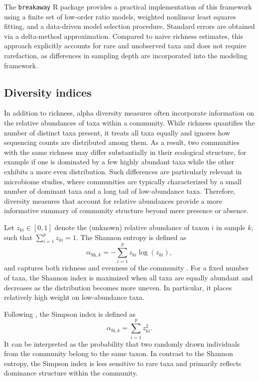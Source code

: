 The \texttt{breakaway} R package provides a practical implementation of this framework using a finite set of low-order ratio models, weighted nonlinear least squares fitting, and a data-driven model selection procedure. Standard errors are obtained via a delta-method approximation. Compared to naive richness estimates, this approach explicitly accounts for rare and unobserved taxa and does not require rarefaction, as differences in sampling depth are incorporated into the modeling framework.

\subsection{Diversity indices}
\label{sec:3community:within:diversity}

In addition to richness, alpha diversity measures often incorporate information on the relative abundances of taxa within a community. While richness quantifies the number of distinct taxa present, it treats all taxa equally and ignores how sequencing counts are distributed among them. As a result, two communities with the same richness may differ substantially in their ecological structure, for example if one is dominated by a few highly abundant taxa while the other exhibits a more even distribution. Such differences are particularly relevant in microbiome studies, where communities are typically characterized by a small number of dominant taxa and a long tail of low-abundance taxa. Therefore, diversity measures that account for relative abundances provide a more informative summary of community structure beyond mere presence or absence.

Let $z_{ki} \in [0,1]$ denote the (unknown) relative abundance of taxon $i$ in sample $k$, such that $\sum_{i=1}^p z_{ki} = 1$. The Shannon entropy is defined as
\begin{equation}
\label{eq:3community:shannon}
\alpha_{\mathrm{Sh}, k} = - \sum_{i=1}^p z_{ki} \log(z_{ki}),
\end{equation}
and captures both richness and evenness of the community \citep{willis2018divnet}. For a fixed number of taxa, the Shannon index is maximized when all taxa are equally abundant and decreases as the distribution becomes more uneven. In particular, it places relatively high weight on low-abundance taxa.

Following \citet{willis2018divnet}, the Simpson index is defined as
\begin{equation}
\label{eq:3community:simpson}
\alpha_{\mathrm{Si}, k} = \sum_{i=1}^p z_{ki}^2.
\end{equation}
It can be interpreted as the probability that two randomly drawn individuals from the community belong to the same taxon. In contrast to the Shannon entropy, the Simpson index is less sensitive to rare taxa and primarily reflects dominance structure within the community.

